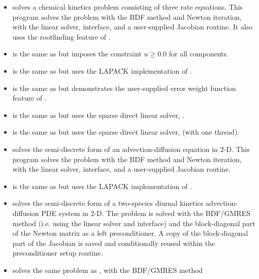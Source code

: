 \begin{itemize}
\item {}
  solves a chemical kinetics problem consisting of three rate equations.
  \newline
  This program solves the problem with the BDF method and Newton
  iteration, with the {\sunlinsoldense} linear solver, {\cvls}
  interface, and a user-supplied Jacobian routine.  It also uses the
  rootfinding feature of {\cvode}.
\item {}
  is the same as  but imposes the constraint
  $u \geq 0.0$ for all components.
\item {}
  is the same as  but uses the LAPACK
  implementation of {\sunlinsollapdense}.
\item {}
  is the same as  but demonstrates the user-supplied error
  weight function feature of {\cvode}.
\item {}
  is the same as  but uses the {\klu} sparse direct
  linear solver, {\sunlinsolklu}.
\item {}
  is the same as  but uses the {\superlumt} sparse
  direct linear solver, {\sunlinsolslumt} (with one thread).
\item {}
  solves the semi-discrete form of an advection-diffusion equation in 2-D.
  \newline
  This program solves the problem with the BDF method and Newton
  iteration, with the {\sunlinsolband} linear solver, {\cvls}
  interface, and a user-supplied Jacobian routine.
\item {}
  is the same as  but uses the LAPACK
  implementation of {\sunlinsollapband}.
\item {}
  solves the semi-discrete form of a two-species diurnal kinetics
  advection-diffusion PDE system in 2-D.
  \newline
  The problem is solved with the BDF/GMRES method (i.e.
  using the {\sunlinsolspgmr} linear solver and {\cvls} interface)
  and the block-diagonal part of the Newton matrix as a left
  preconditioner. A copy of the block-diagonal part of the Jacobian is
  saved and conditionally reused within the preconditioner setup routine.
\item {}
  solves the same problem as , with the BDF/GMRES method

\end{itemize}
